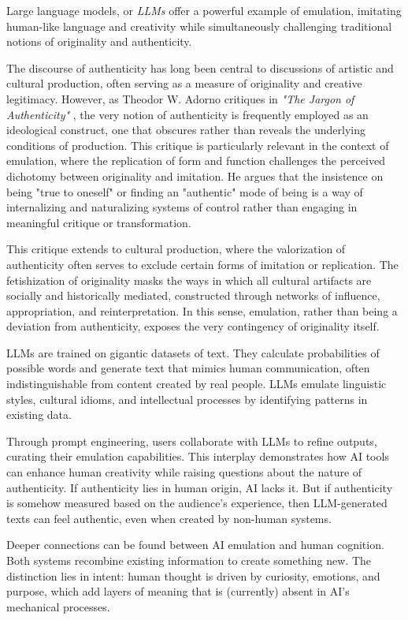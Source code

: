 Large language models, or \textit{LLMs} offer a powerful example of emulation, imitating human-like language and creativity while simultaneously challenging traditional notions of originality and authenticity.

The discourse of authenticity has long been central to discussions of artistic and cultural production, often serving as a measure of originality and creative legitimacy. However, as Theodor W. Adorno critiques in \textit{"The Jargon of Authenticity"} \citep{adorno1973}, the very notion of authenticity is frequently employed as an ideological construct, one that obscures rather than reveals the underlying conditions of production. This critique is particularly relevant in the context of emulation, where the replication of form and function challenges the perceived dichotomy between originality and imitation. He argues that the insistence on being "true to oneself" or finding an "authentic" mode of being is a way of internalizing and naturalizing systems of control rather than engaging in meaningful critique or transformation.

This critique extends to cultural production, where the valorization of authenticity often serves to exclude certain forms of imitation or replication. The fetishization of originality masks the ways in which all cultural artifacts are socially and historically mediated, constructed through networks of influence, appropriation, and reinterpretation. In this sense, emulation, rather than being a deviation from authenticity, exposes the very contingency of originality itself.

LLMs are trained on gigantic datasets of text. They calculate probabilities of possible words and generate text that mimics human communication, often indistinguishable from content created by real people. LLMs emulate linguistic styles, cultural idioms, and intellectual processes by identifying patterns in existing data. 

Through prompt engineering, users collaborate with LLMs to refine outputs, curating their emulation capabilities. This interplay demonstrates how AI tools can enhance human creativity while raising questions about the nature of authenticity. If authenticity lies in human origin, AI lacks it. But if authenticity is somehow measured based on the audience's experience, then LLM-generated texts can feel authentic, even when created by non-human systems.

Deeper connections can be found between AI emulation and human cognition. Both systems recombine existing information to create something new. The distinction lies in intent: human thought is driven by curiosity, emotions, and purpose, which add layers of meaning that is (currently) absent in AI's mechanical processes.

